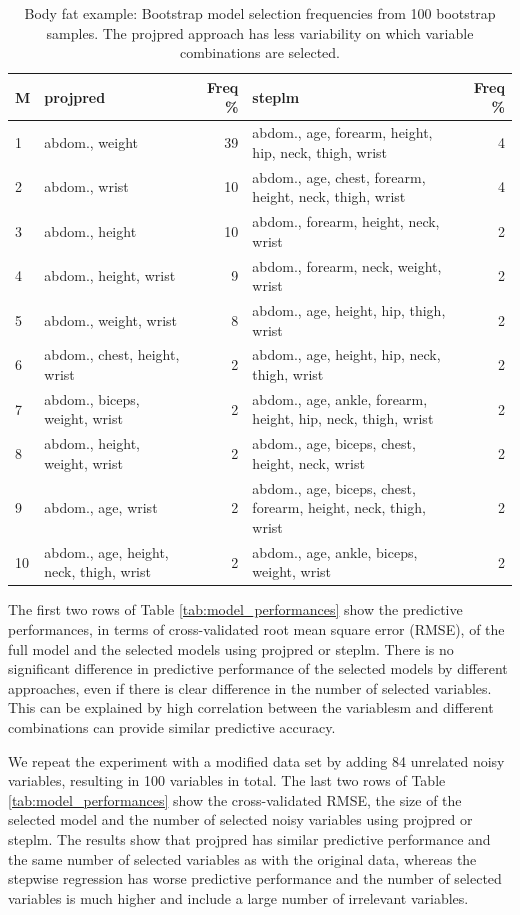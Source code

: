 \documentclass[a4]{article}
\theoremstyle{definition}
\begin{document}
\begin{table}[tp]
\footnotesize
\centering
\begin{tabular}{l|lr|lr}
M & projpred & Freq \% & steplm & Freq \%  \\ 
  \hline
1 & abdom., weight & 39 & abdom., age, forearm, height, hip, neck, thigh, wrist & 4 \\
2 & abdom., wrist & 10 & abdom., age, chest, forearm, height, neck, thigh, wrist & 4 \\
3 & abdom., height & 10 & abdom., forearm, height, neck, wrist & 2 \\
4 & abdom., height, wrist & 9 & abdom., forearm, neck, weight, wrist & 2 \\
5 & abdom., weight, wrist & 8 & abdom., age, height, hip, thigh, wrist & 2 \\
6 & abdom., chest, height, wrist & 2 & abdom., age, height, hip, neck, thigh, wrist & 2 \\
7 & abdom., biceps, weight, wrist & 2 & abdom., age, ankle, forearm, height, hip, neck, thigh, wrist & 2 \\
8 & abdom., height, weight, wrist & 2 & abdom., age, biceps, chest, height, neck, wrist & 2 \\
9 & abdom., age, wrist & 2 & abdom., age, biceps, chest, forearm, height, neck, thigh, wrist & 2 \\
10 & abdom., age, height, neck, thigh, wrist & 2 & abdom., age, ankle, biceps, weight, wrist & 2 \\
\end{tabular}
\caption{Body fat example: Bootstrap model selection frequencies from 100 bootstrap samples.  The projpred approach has less variability on which variable combinations are selected.}
\label{tab:model_frequencies}
\end{table}


The first two rows of Table \ref{tab:model_performances} show the
predictive performances, in terms of cross-validated root mean square
error (RMSE), of the full model and the selected models using projpred
or steplm.  There is no significant difference in predictive performance
of the selected models by different approaches, even if there is
clear difference in the number of selected variables. This can be explained by high
correlation between the variablesm and different combinations can
provide similar predictive accuracy.

We repeat the experiment with a modified data set by adding 84
unrelated noisy variables, resulting in 100 variables in total. 
The last two rows of Table
\ref{tab:model_performances} show the cross-validated RMSE, the size
of the selected model and the number of selected noisy variables using
projpred or steplm. The results show that projpred has similar
predictive performance and the same number of selected variables as
with the original data, whereas the stepwise regression has worse
predictive performance and the number of selected variables is much
higher and include a large number of irrelevant variables.
\end{document}
